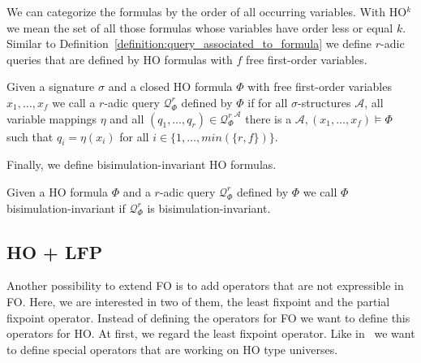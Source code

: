 We can categorize the formulas by the order of all occurring variables. With HO$^k$ we mean 
the set of all those formulas whose variables have order less or equal $k$.
Similar to Definition~\ref{definition:query_associated_to_formula} we define $r$-adic queries that are defined by HO formulas with $f$ free first-order variables. 

\begin{definition}
\label{definition:query_associated_to_formula_ho}
    Given a signature $\sigma$ and a closed HO
    formula $\Phi$ with free first-order variables $x_1, \dots, x_f$ we call a $r$-adic query $\mathcal{Q}^r_\Phi$ defined by $\Phi$ if for all $\sigma$-structures
    $\mathcal{A}$, all variable mappings $\eta$ and all $(q_1, \dots, q_r) \in {\mathcal{Q}^r_\Phi}^\mathcal{A}$ there is a $\mathcal{A}, (x_1, \dots, x_f) \models
     \Phi$ such that $q_i = \eta(x_i)$ for all $i \in
    \{1, \dots, min(\{r, f\})\}$.
\end{definition}

Finally, we define bisimulation-invariant HO formulas.

\begin{definition} 
\label{definition:bisimulation_invariant_ho_formula}
	Given a HO formula $\Phi$ and a $r$-adic query $\mathcal{Q}^r_\Phi$ defined by $\Phi$ we call $\Phi$ bisimulation-invariant if $\mathcal{Q}^r_\Phi$ is bisimulation-invariant.
\end{definition}

\subsection{HO + LFP}
\label{subsec:hoPlusLfp}

Another possibility to extend FO is to add operators that are not expressible in FO. Here, we are interested in two
of them, the least fixpoint and the partial fixpoint operator. Instead of defining the operators for FO we want
to define this operators for HO. At first, we regard the least fixpoint operator.
Like in~\cite{freireMartins2011descriptive} we want to define special operators that are working on HO type universes.


